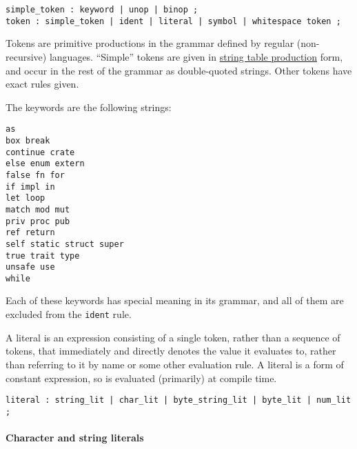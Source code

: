 \documentclass[]{article}
\begin{document}
\begin{verbatim}
simple_token : keyword | unop | binop ;
token : simple_token | ident | literal | symbol | whitespace token ;
\end{verbatim}

Tokens are primitive productions in the grammar defined by regular
(non-recursive) languages. ``Simple'' tokens are given in
\hyperref[string-table-productions]{string table production} form, and
occur in the rest of the grammar as double-quoted strings. Other tokens
have exact rules given.


The keywords are the following strings:

\begin{verbatim}
as
box break
continue crate
else enum extern
false fn for
if impl in
let loop
match mod mut
priv proc pub
ref return
self static struct super
true trait type
unsafe use
while
\end{verbatim}

Each of these keywords has special meaning in its grammar, and all of
them are excluded from the \texttt{ident} rule.


A literal is an expression consisting of a single token, rather than a
sequence of tokens, that immediately and directly denotes the value it
evaluates to, rather than referring to it by name or some other
evaluation rule. A literal is a form of constant expression, so is
evaluated (primarily) at compile time.

\begin{verbatim}
literal : string_lit | char_lit | byte_string_lit | byte_lit | num_lit ;
\end{verbatim}

\paragraph{Character and string
literals}\label{character-and-string-literals}
\end{document}
